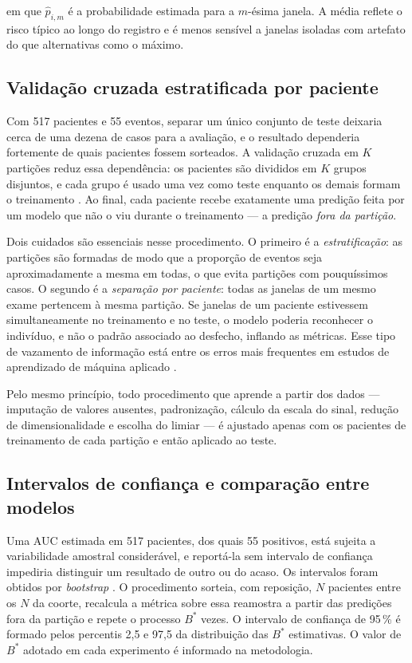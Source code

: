\noindent
em que $\hat{p}_{i,m}$ é a probabilidade estimada para a $m$-ésima janela. A
média reflete o risco típico ao longo do registro e é menos sensível a
janelas isoladas com artefato do que alternativas como o máximo.

\subsection{Validação cruzada estratificada por paciente}
\label{subsec:fund-validacao-cruzada}

Com 517 pacientes e 55 eventos, separar um único conjunto de teste deixaria
cerca de uma dezena de casos para a avaliação, e o resultado dependeria
fortemente de quais pacientes fossem sorteados. A validação cruzada em $K$
partições reduz essa dependência: os pacientes são divididos em $K$ grupos
disjuntos, e cada grupo é usado uma vez como teste enquanto os demais formam
o treinamento \cite{kohavi1995study}. Ao final, cada paciente recebe
exatamente uma predição feita por um modelo que não o viu durante o
treinamento --- a predição \textit{fora da partição}.

Dois cuidados são essenciais nesse procedimento. O primeiro é a
\textit{estratificação}: as partições são formadas de modo que a proporção de
eventos seja aproximadamente a mesma em todas, o que evita partições com
pouquíssimos casos. O segundo é a \textit{separação por paciente}: todas as
janelas de um mesmo exame pertencem à mesma partição. Se janelas de um
paciente estivessem simultaneamente no treinamento e no teste, o modelo
poderia reconhecer o indivíduo, e não o padrão associado ao desfecho,
inflando as métricas. Esse tipo de vazamento de informação está entre os
erros mais frequentes em estudos de aprendizado de máquina aplicado
\cite{kapoor2023leakage}.

Pelo mesmo princípio, todo procedimento que aprende a partir dos dados ---
imputação de valores ausentes, padronização, cálculo da escala do sinal,
redução de dimensionalidade e escolha do limiar --- é ajustado apenas com os
pacientes de treinamento de cada partição e então aplicado ao teste.

\subsection{Intervalos de confiança e comparação entre modelos}
\label{subsec:fund-bootstrap}

Uma \gls{AUC} estimada em 517 pacientes, dos quais 55 positivos, está sujeita
a variabilidade amostral considerável, e reportá-la sem intervalo de
confiança impediria distinguir um resultado de outro ou do acaso. Os
intervalos foram obtidos por \textit{bootstrap} \cite{efron1993introduction}.
O procedimento sorteia, com reposição, $N$ pacientes entre os $N$ da coorte,
recalcula a métrica sobre essa reamostra a partir das predições fora da
partição e repete o processo $B^{*}$ vezes. O intervalo de confiança de 95\,\%
é formado pelos percentis 2,5 e 97,5 da distribuição das $B^{*}$ estimativas.
O valor de $B^{*}$ adotado em cada experimento é informado na metodologia.

